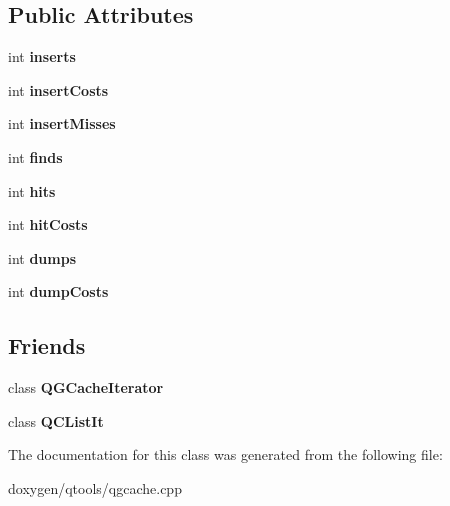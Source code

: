 \subsection*{Public Attributes}
\begin{DoxyCompactItemize}
\item 
\mbox{\label{class_q_c_list_aacc28ac7151331c5f16b95f9d6806d92}} 
int {\bfseries inserts}
\item 
\mbox{\label{class_q_c_list_abfd6c3fbbceb7f2d63a4bf20c0dfc600}} 
int {\bfseries insert\+Costs}
\item 
\mbox{\label{class_q_c_list_a9338d57b508b2ba4cdd5c43cde2ecfc2}} 
int {\bfseries insert\+Misses}
\item 
\mbox{\label{class_q_c_list_a5a2694263c88683048754d331940fd98}} 
int {\bfseries finds}
\item 
\mbox{\label{class_q_c_list_ae01f66105a2fde02e0c2d5eb7f2ced92}} 
int {\bfseries hits}
\item 
\mbox{\label{class_q_c_list_af39b0251f745c302cdcb70f9a673d92a}} 
int {\bfseries hit\+Costs}
\item 
\mbox{\label{class_q_c_list_ad767b5c4aecdf9f35b5bc07d67303e36}} 
int {\bfseries dumps}
\item 
\mbox{\label{class_q_c_list_a7e76a9fcd2fbb6ebb4ca3d1d1dc392e8}} 
int {\bfseries dump\+Costs}
\end{DoxyCompactItemize}
\subsection*{Friends}
\begin{DoxyCompactItemize}
\item 
\mbox{\label{class_q_c_list_a37933afdeb94bef86bf66aca84fc229c}} 
class {\bfseries Q\+G\+Cache\+Iterator}
\item 
\mbox{\label{class_q_c_list_a3e8195ca5690dd80612249a0ccb62f8f}} 
class {\bfseries Q\+C\+List\+It}
\end{DoxyCompactItemize}


The documentation for this class was generated from the following file\+:\begin{DoxyCompactItemize}
\item 
doxygen/qtools/qgcache.\+cpp\end{DoxyCompactItemize}
